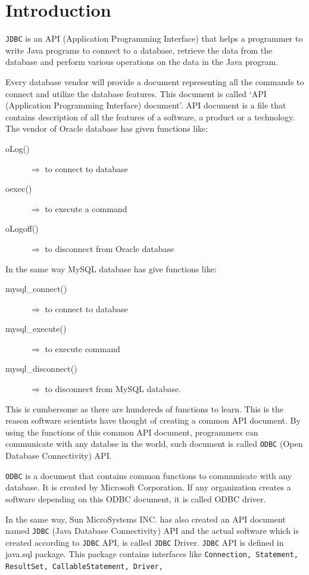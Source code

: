 \documentclass[11pt,a4paper]{article}
\author{TalentSprint}
\date{}
\begin{document}
\section*{Introduction}
\texttt{JDBC} is an API (Application Programming Interface) that helps a programmer to write Java programs to connect to a database, retrieve the data from the database and perform various operations on the data in the Java program.

Every database vendor will provide a document representing all the commands to connect and utilize the database features. This document is called `API (Application Programming Interface) document'. API document is a file that contains description of all the features of a software, a product or a technology. The vendor of Oracle database has given functions like:
\begin{description} 
\item [oLog()] $\Longrightarrow$ to connect to database
\item [oexec()] $\Longrightarrow$ to execute a command
\item [oLogoff()] $\Longrightarrow$ to disconnect from Oracle database
\end{description}
In the same way MySQL database has give functions like: 
\begin{description}
\item [mysql\_connect()] $\Longrightarrow$ to connect to database
\item [mysql\_execute()] $\Longrightarrow$ to execute command
\item [mysql\_disconnect()] $\Longrightarrow$ to disconnect from MySQL database. 
\end{description}
This is cumbersome as there are hundereds of functions to learn. This is the reason software scientists have thought of creating a common API document. By using the functions of this common API document, programmers can communicate with any databse in the world, such document is called \texttt{ODBC} (Open Database Connectivity) API.

\texttt{ODBC} is a document that contains common functions to communicate with any database. It is created by Microsoft Corporation. If any organization creates a software depending on this ODBC document, it is called ODBC driver.

In the same way, Sun MicroSystems INC. has also created an API document named \texttt{JDBC} (Java Database Connectivity) API and the actual software which is created according to  \texttt{JDBC} API, is called \texttt{JDBC} Driver. \texttt{JDBC} API is defined in java.sql package. This package contains interfaces like \texttt{Connection, Statement, ResultSet, CallableStatement, Driver,}
\end{document}
